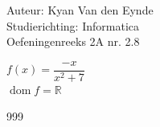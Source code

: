 \documentclass[a4paper]{article}
\begin{document}
  
\noindent \large Auteur: Kyan Van den Eynde \\
\noindent \large Studierichting: Informatica\\
\noindent \large Oefeningenreeks 2A nr. 2.8\\

\medskip

\normalsize

$f(x) = \dfrac{-x}{x^2+7}$\\

$\operatorname{dom}f = \mathbb{R}$\\

\begin{thebibliography}{999}
\end{thebibliography}
\end{document}
